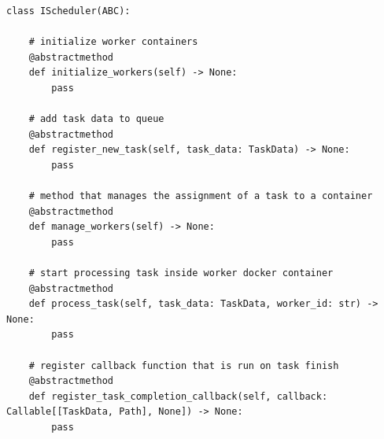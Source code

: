 \lstset{style=python}
\begin{lstlisting}[caption = {Interfejs orkiestratora kontenerów.}]
	class IScheduler(ABC):

    # initialize worker containers
    @abstractmethod
    def initialize_workers(self) -> None:
        pass
     
    # add task data to queue 
    @abstractmethod
    def register_new_task(self, task_data: TaskData) -> None:
        pass

    # method that manages the assignment of a task to a container
    @abstractmethod
    def manage_workers(self) -> None:
        pass

    # start processing task inside worker docker container
    @abstractmethod
    def process_task(self, task_data: TaskData, worker_id: str) -> None:
        pass

    # register callback function that is run on task finish
    @abstractmethod
    def register_task_completion_callback(self, callback: Callable[[TaskData, Path], None]) -> None:
        pass
\end{lstlisting}

